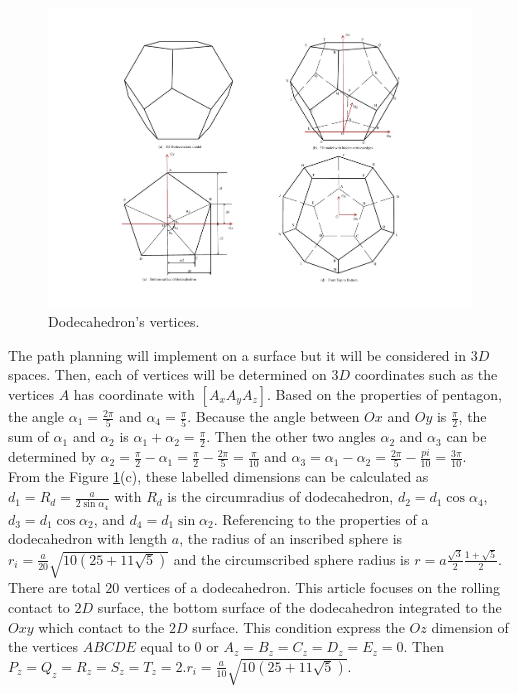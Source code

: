 \begin{figure}[h]
\centering
	\includegraphics[width=1\textwidth]{image/dodecahedron3.pdf}
	\caption{Dodecahedron's vertices.}
	\label{fig:dodecahedron2}
\end{figure}

The path planning will implement on a surface but it will be considered in $3D$ spaces. Then, each of vertices will be determined on $3D$ coordinates such as the vertices $A$ has coordinate with $[A_x A_y A_z]$. Based on the properties of pentagon, the angle $\alpha_1=\frac{2\pi}{5}$ and $\alpha_4=\frac{\pi}{5}$. Because the angle between $Ox$ and $Oy$ is $\frac{\pi}{2}$, the sum of $\alpha_1$ and $\alpha_2$ is $\alpha_1 + \alpha_2 = \frac{\pi}{2}$. Then the other two angles $\alpha_2$ and $\alpha_3$ can be determined by $\alpha_2 = \frac{\pi}{2}-\alpha_1 = \frac{\pi}{2}-\frac{2\pi}{5} = \frac{\pi}{10}$ and $\alpha_3 = \alpha_1-\alpha_2 = \frac{2\pi}{5}-\frac{pi}{10} = \frac{3\pi}{10}$.\\

From the Figure \ref{fig:dodecahedron2}(c), these labelled dimensions can be calculated as $d_1 = R_d = \frac{a}{2\sin{\alpha_4}}$ with $R_d$ is the circumradius of dodecahedron, $d_2 = d_1\cos{\alpha_4}$, $d_3 = d_1\cos{\alpha_2}$, and $d_4 = d_1\sin{\alpha_2}$. Referencing to the properties of a dodecahedron with length $a$, the radius of an inscribed sphere is $r_i = \frac{a}{20}\sqrt{10(25+11\sqrt{5})}$ and the circumscribed sphere radius is $r = a\frac{\sqrt{3}}{2}\frac{1+\sqrt{5}}{2}$.\\

There are total $20$ vertices of a dodecahedron. This article focuses on the rolling contact to $2D$ surface, the bottom surface of the dodecahedron integrated to the $Oxy$ which contact to the $2D$ surface. This condition express the $Oz$ dimension of the vertices $ABCDE$ equal to $0$ or $A_z = B_z = C_z = D_z = E_z = 0$. Then $P_z = Q_z = R_z = S_z = T_z = 2.r_i = \frac{a}{10}\sqrt{10(25+11\sqrt{5})}$.\\

